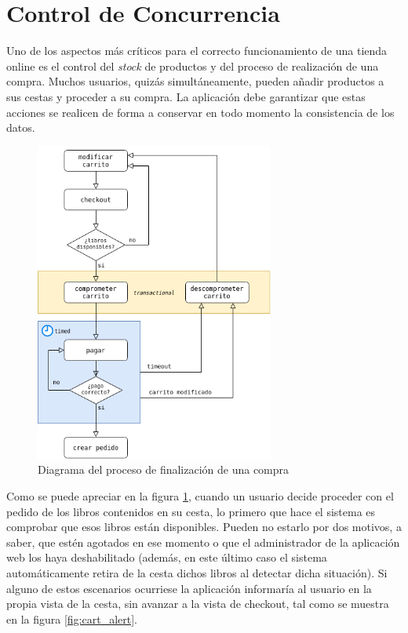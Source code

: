 \documentclass[a4paper,12pt,twoside,openright]{report}
\begin{document}
    \section{Control de Concurrencia} \label{sec:concurrencia}
    Uno de los aspectos más críticos para el correcto funcionamiento de una tienda online es el control del \emph{stock} de productos y del proceso de realización de una compra. Muchos usuarios, quizás simultáneamente, pueden añadir productos a sus cestas y proceder a su compra. La aplicación debe garantizar que estas acciones se realicen de forma a conservar en todo momento la consistencia de los datos.
    
    \begin{figure}[hbt!]
    	\centering
    	\includegraphics[width=0.7\textwidth,keepaspectratio]{cart_concurrent}
    	\caption{Diagrama del proceso de finalización de una compra}
    	\label{fig:cart_concurrent}
    \end{figure}
    
    Como se puede apreciar en la figura \ref{fig:cart_concurrent}, cuando un usuario decide proceder con el pedido de los libros contenidos en su cesta, lo primero que hace el sistema es comprobar que esos libros están disponibles. Pueden no estarlo por dos motivos, a saber, que estén agotados en ese momento o que el administrador de la aplicación web los haya deshabilitado (además, en este último caso el sistema automáticamente retira de la cesta dichos libros al detectar dicha situación). Si alguno de estos escenarios ocurriese la aplicación informaría al usuario en la propia vista de la cesta, sin avanzar a la vista de checkout, tal como se muestra en la figura \ref{fig:cart_alert}.
    
\end{document}
